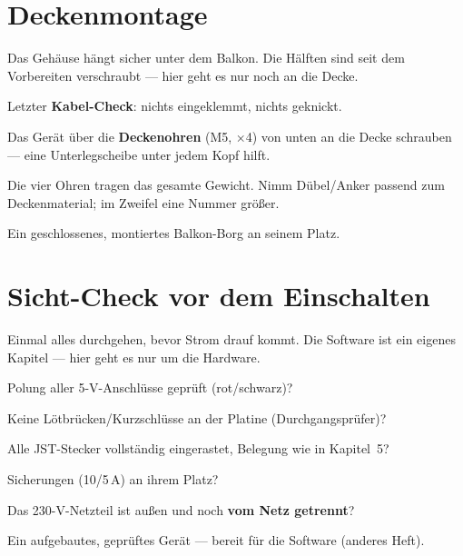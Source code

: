 \section{Deckenmontage}
\begin{ziel}
Das Gehäuse hängt sicher unter dem Balkon. Die Hälften sind seit dem Vorbereiten
verschraubt — hier geht es nur noch an die Decke.
\end{ziel}
\begin{schritte}
  \item Letzter \textbf{Kabel-Check}: nichts eingeklemmt, nichts geknickt.
  \item Das Gerät über die \textbf{Deckenohren} (M5, ×4) von unten an die Decke schrauben —
        eine Unterlegscheibe unter jedem Kopf hilft.
\end{schritte}
\begin{warum}
Die vier Ohren tragen das gesamte Gewicht. Nimm Dübel/Anker passend zum Deckenmaterial;
im Zweifel eine Nummer größer.
\end{warum}
\begin{ergebnis}
Ein geschlossenes, montiertes Balkon-Borg an seinem Platz.
\end{ergebnis}

\clearpage
\section{Sicht-Check vor dem Einschalten}
\begin{ziel}
Einmal alles durchgehen, bevor Strom drauf kommt. Die Software ist ein eigenes Kapitel —
hier geht es nur um die Hardware.
\end{ziel}
\begin{schritte}
  \item Polung aller 5-V-Anschlüsse geprüft (rot/schwarz)?
  \item Keine Lötbrücken/Kurzschlüsse an der Platine (Durchgangsprüfer)?
  \item Alle JST-Stecker vollständig eingerastet, Belegung wie in Kapitel~5?
  \item Sicherungen (10/5\,A) an ihrem Platz?
  \item Das 230-V-Netzteil ist außen und noch \textbf{vom Netz getrennt}?
\end{schritte}
\begin{ergebnis}
Ein aufgebautes, geprüftes Gerät — bereit für die Software (anderes Heft).
\end{ergebnis}

